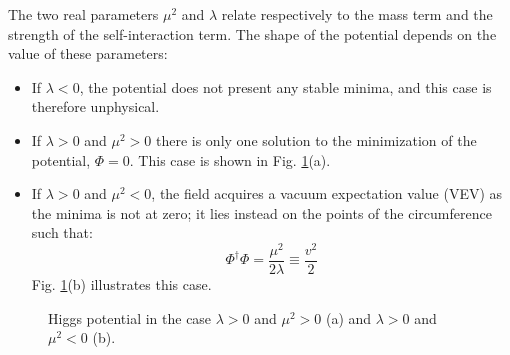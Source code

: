 \noindent The two real parameters $\mu^2$ and $\lambda$ relate respectively to the mass term and the strength of the self-interaction term. The shape of the potential depends on the value of these parameters:
\begin{itemize}
\item If $\lambda < 0$, the potential does not present any stable minima, and this case is therefore unphysical.
\item If $\lambda > 0$ and $\mu^2 > 0$ there is only one solution to the minimization of the potential, $\Phi=0$. This case is shown in Fig. \ref{fig:sm:HiggsV}(a).
\item If $\lambda > 0$ and $\mu^2 < 0$, the field acquires a vacuum expectation value (VEV) as the minima is not at zero; it lies instead on the points of the circumference such that:
\begin{equation}
\Phi^{\dagger} \Phi = \frac{\mu^2}{2 \lambda}  \equiv \frac{v^2}{2}
\end{equation}
\noindent Fig. \ref{fig:sm:HiggsV}(b) illustrates this case.
\end{itemize}


\begin{figure}[ht]
\centering
{}
\caption{Higgs potential in the case $\lambda > 0$ and $\mu^2 > 0$ (a) and $\lambda > 0$ and $\mu^2 < 0$ (b).}
\label{fig:sm:HiggsV}
\end{figure}

